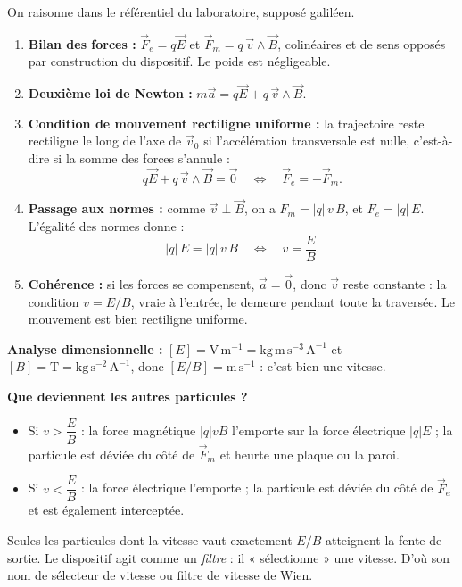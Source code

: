 \documentclass[11pt]{article}
\newcommand{\cle}[1]{{\popxbold\color{popdark}#1}}
\begin{document}
\begin{experience}
On raisonne dans le référentiel du laboratoire, supposé galiléen.
\begin{enumerate}
\item \textbf{Bilan des forces :} $\vec{F}_e = q\vec{E}$ et $\vec{F}_m = q\,\vec{v}\wedge\vec{B}$, colinéaires et de sens opposés par construction du dispositif. Le poids est négligeable.
\item \textbf{Deuxième loi de Newton :} $m\vec{a} = q\vec{E} + q\,\vec{v}\wedge\vec{B}$.
\item \textbf{Condition de mouvement rectiligne uniforme :} la trajectoire reste rectiligne le long de l'axe de $\vec{v}_0$ si l'accélération transversale est nulle, c'est-à-dire si la somme des forces s'annule :
\[ q\vec{E} + q\,\vec{v}\wedge\vec{B} = \vec{0} \quad\Longleftrightarrow\quad \vec{F}_e = -\vec{F}_m. \]
\item \textbf{Passage aux normes :} comme $\vec{v}\perp\vec{B}$, on a $F_m = |q|\,v\,B$, et $F_e = |q|\,E$. L'égalité des normes donne :
\[ |q|\,E = |q|\,v\,B \quad\Longleftrightarrow\quad v = \dfrac{E}{B}. \]
\item \textbf{Cohérence :} si les forces se compensent, $\vec{a} = \vec{0}$, donc $\vec{v}$ reste constante : la condition $v = E/B$, vraie à l'entrée, le demeure pendant toute la traversée. Le mouvement est bien rectiligne uniforme.
\end{enumerate}
\textbf{Analyse dimensionnelle :} $[E] = \mathrm{V\,m^{-1}} = \mathrm{kg\,m\,s^{-3}\,A^{-1}}$ et $[B] = \mathrm{T} = \mathrm{kg\,s^{-2}\,A^{-1}}$, donc $[E/B] = \mathrm{m\,s^{-1}}$ : c'est bien une vitesse.
\end{experience}

\textbf{Que deviennent les autres particules ?}
\begin{itemize}
\item Si $v > \dfrac{E}{B}$ : la force magnétique $|q|vB$ l'emporte sur la force électrique $|q|E$ ; la particule est déviée du côté de $\vec{F}_m$ et heurte une plaque ou la paroi.
\item Si $v < \dfrac{E}{B}$ : la force électrique l'emporte ; la particule est déviée du côté de $\vec{F}_e$ et est également interceptée.
\end{itemize}
Seules les particules dont la vitesse vaut exactement $E/B$ atteignent la fente de sortie. Le dispositif agit comme un \emph{filtre} : il « sélectionne » une vitesse. D'où son nom de \cle{sélecteur de vitesse} ou \cle{filtre de vitesse de Wien}.
\end{document}
